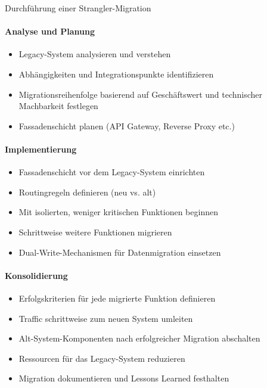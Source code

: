 \begin{KR}{Durchführung einer Strangler-Migration}\\
    \paragraph{Analyse und Planung}
    \begin{itemize}
        \item Legacy-System analysieren und verstehen
        \item Abhängigkeiten und Integrationspunkte identifizieren
        \item Migrationsreihenfolge basierend auf Geschäftswert und technischer Machbarkeit festlegen
        \item Fassadenschicht planen (API Gateway, Reverse Proxy etc.)
    \end{itemize}
    
    \paragraph{Implementierung}
    \begin{itemize}
        \item Fassadenschicht vor dem Legacy-System einrichten
        \item Routingregeln definieren (neu vs. alt)
        \item Mit isolierten, weniger kritischen Funktionen beginnen
        \item Schrittweise weitere Funktionen migrieren
        \item Dual-Write-Mechanismen für Datenmigration einsetzen
    \end{itemize}
    
    \paragraph{Konsolidierung}
    \begin{itemize}
        \item Erfolgskriterien für jede migrierte Funktion definieren
        \item Traffic schrittweise zum neuen System umleiten
        \item Alt-System-Komponenten nach erfolgreicher Migration abschalten
        \item Ressourcen für das Legacy-System reduzieren
        \item Migration dokumentieren und Lessons Learned festhalten
    \end{itemize}
\end{KR}

